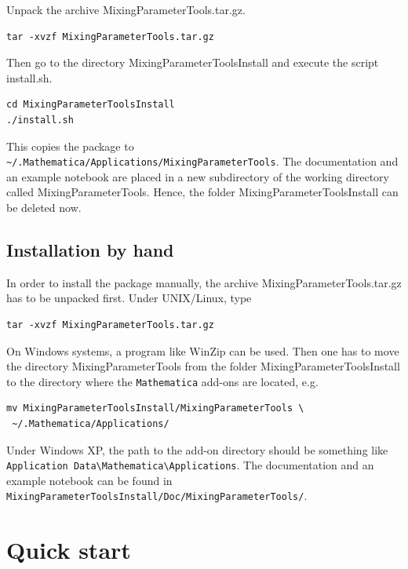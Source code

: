 \documentclass[12pt,a4paper,twoside]{scrartcl}
\numberwithin{equation}{section}
\numberwithin{table}{section}
\def\Mathematica{\texttt{Mathematica}}
\begin{document}
Unpack the archive MixingParameterTools.tar.gz.
\begin{verbatim}
tar -xvzf MixingParameterTools.tar.gz
\end{verbatim}
Then go to the directory MixingParameterToolsInstall and execute the
script install.sh.
\begin{verbatim}
cd MixingParameterToolsInstall
./install.sh
\end{verbatim}
This copies the package to
\verb+~/.Mathematica/Applications/MixingParameterTools+.  
The documentation and an example notebook are placed in a new
subdirectory of the working directory called MixingParameterTools.
Hence, the folder MixingParameterToolsInstall can be deleted now.


\subsection{Installation by hand}

In order to install the package manually, the archive
MixingParameterTools.tar.gz has to be unpacked first.  Under UNIX/Linux,
type
\begin{verbatim}
tar -xvzf MixingParameterTools.tar.gz
\end{verbatim}
On Windows systems, a program like WinZip can be used.
Then one has to move the directory MixingParameterTools from the folder
MixingParameterToolsInstall to the directory
where the \Mathematica{} add-ons are located, e.g.\
\begin{verbatim}
mv MixingParameterToolsInstall/MixingParameterTools \
 ~/.Mathematica/Applications/
\end{verbatim}
Under Windows XP, the path to the add-on directory should be something
like\\ \verb+Application Data\Mathematica\Applications+.
The documentation and an example notebook can be found in\\
\verb+MixingParameterToolsInstall/Doc/MixingParameterTools/+.

\clearpage


\section{Quick start}
\end{document}
